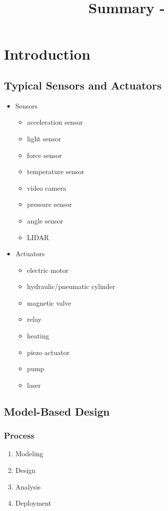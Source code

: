 \documentclass[10pt,a4paper]{article}
\title{Summary - \lecture}
\author{}
\date{}
\begin{document}
\tableofcontents
\pagebreak

\section{Introduction}
\subsection{Typical Sensors and Actuators}
\begin{itemize}
	\item Sensors
	\begin{itemize}
		\item acceleration sensor
		\item light sensor
		\item force sensor
		\item temperature sensor
		\item video camera
		\item pressure sensor
		\item angle sensor
		\item LIDAR
	\end{itemize}
	\item Actuators
	\begin{itemize}
		\item electric motor
		\item hydraulic/pneumatic cylinder
		\item magnetic valve
		\item relay
		\item heating
		\item piezo actuator
		\item pump
		\item laser
	\end{itemize}
\end{itemize}

\subsection{Model-Based Design}
\subsubsection{Process}
\begin{enumerate}
	\item Modeling
	\item Design
	\item Analysis
	\item Deployment
\end{enumerate}
\end{document}
